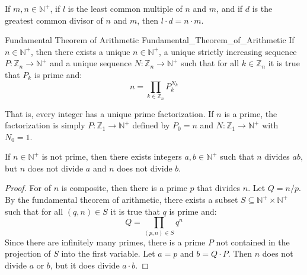 \documentclass{article}                                                        %
\begin{document}
            \begin{theorem}
                If $m,n\in\mathbb{N}^{+}$, if $l$ is the least common multiple of
                $n$ and $m$, and if $d$ is the greatest common divisor of $n$ and
                $m$, then $l\cdot{d}=n\cdot{m}$.
            \end{theorem}
            \begin{ftheorem}{Fundamental Theorem of Arithmetic}
                            {Fundamental_Theorem_of_Arithmetic}
                If $n\in\mathbb{N}^{+}$, then there exists a unique
                $n\in\mathbb{N}^{+}$, a unique strictly increasing sequence
                $P:\mathbb{Z}_{n}\rightarrow\mathbb{N}^{+}$ and a unique
                sequence $N:\mathbb{Z}_{n}\rightarrow\mathbb{N}^{+}$ such that
                for all $k\in\mathbb{Z}_{n}$ it is true that $P_{k}$ is prime
                and:
                \begin{equation*}
                    n=\prod_{k\in\mathbb{Z}_{n}}P_{k}^{N_{k}}
                \end{equation*}
            \end{ftheorem}
            That is, every integer has a unique prime factorization. If $n$ is a
            prime, the factorization is simply
            $P:\mathbb{Z}_{1}\rightarrow\mathbb{N}^{+}$ defined by $P_{0}=n$ and
            $N:\mathbb{Z}_{1}\rightarrow\mathbb{N}^{+}$ with $N_{0}=1$.
            \begin{theorem}
                \label{thm:Composite_N_Exists_AB_N_Div_AB_and_N_NDiv_A_or_B}%
                If $n\in\mathbb{N}^{+}$ is not prime, then there exists
                integers $a,b\in\mathbb{N}^{+}$ such that $n$ divides
                $ab$, but $n$ does not divide $a$ and $n$ does not divide $b$.
            \end{theorem}
            \begin{proof}
                For of $n$ is composite, then there is a prime $p$ that divides
                $n$. Let $Q=n/p$. By the fundamental theorem of arithmetic,
                there exists a subset
                $S\subseteq\mathbb{N}^{+}\times\mathbb{N}^{+}$ such that for all
                $(q,n)\in{S}$ it is true that $q$ is prime and:
                \begin{equation}
                    Q=\prod_{(p,n)\in{S}}q^{n}
                \end{equation}
                Since there are infinitely many primes, there is a prime $P$ not
                contained in the projection of $S$ into the first variable. Let
                $a=p$ and $b=Q\cdot{P}$. Then $n$ does not divide $a$ or $b$,
                but it does divide $a\cdot{b}$.
            \end{proof}
\end{document}
